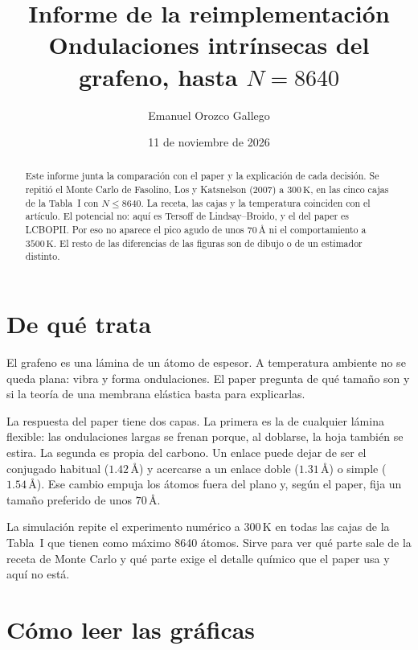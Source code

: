 \documentclass[11pt,a4paper]{article}
\title{Informe de la reimplementación\\[0.35em]
\large Ondulaciones intrínsecas del grafeno, hasta $N=8640$}
\author{Emanuel Orozco Gallego}
\date{11 de noviembre de 2026}
\begin{document}
\maketitle

\begin{abstract}
Este informe junta la comparación con el paper y la explicación de cada decisión.
Se repitió el Monte Carlo de Fasolino, Los y Katsnelson (2007) a $300\,\mathrm{K}$,
en las cinco cajas de la Tabla~I con $N\le 8640$.
La receta, las cajas y la temperatura coinciden con el artículo.
El potencial no: aquí es Tersoff de Lindsay--Broido, y el del paper es LCBOPII.
Por eso no aparece el pico agudo de unos $70\,\text{\AA}$ ni el comportamiento a $3500\,\mathrm{K}$.
El resto de las diferencias de las figuras son de dibujo o de un estimador distinto.
\end{abstract}

\tableofcontents

\section{De qué trata}

El grafeno es una lámina de un átomo de espesor.
A temperatura ambiente no se queda plana: vibra y forma ondulaciones.
El paper pregunta de qué tamaño son y si la teoría de una membrana elástica basta para explicarlas.

La respuesta del paper tiene dos capas.
La primera es la de cualquier lámina flexible: las ondulaciones largas se frenan porque, al doblarse, la hoja también se estira.
La segunda es propia del carbono.
Un enlace puede dejar de ser el conjugado habitual ($1.42\,\text{\AA}$) y acercarse a un enlace doble ($1.31\,\text{\AA}$) o simple ($1.54\,\text{\AA}$).
Ese cambio empuja los átomos fuera del plano y, según el paper, fija un tamaño preferido de unos $70\,\text{\AA}$.

La simulación repite el experimento numérico a $300\,\mathrm{K}$ en todas las cajas de la Tabla~I que tienen como máximo 8640 átomos.
Sirve para ver qué parte sale de la receta de Monte Carlo y qué parte exige el detalle químico que el paper usa y aquí no está.

\section{Cómo leer las gráficas}
\end{document}
